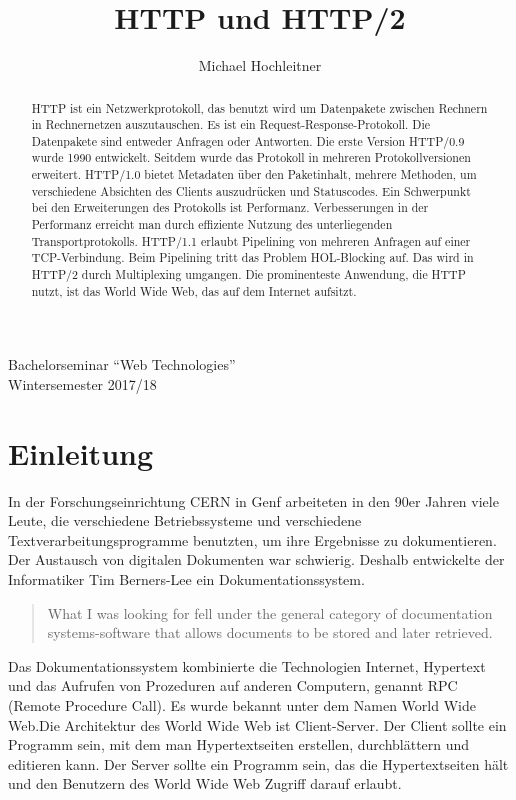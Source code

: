 \documentclass{llncs}
\begin{document}
\title{HTTP und HTTP/2}
\author{Michael Hochleitner}

\maketitle 
\begin{center}
Bachelorseminar ``Web Technologies'' \\
Wintersemester 2017/18
\end{center}

\begin{abstract}
HTTP ist ein Netzwerkprotokoll, das benutzt wird um Datenpakete zwischen Rechnern in Rechnernetzen auszutauschen. Es ist ein Request-Response-Protokoll. Die Datenpakete sind entweder Anfragen oder Antworten. Die erste Version HTTP/0.9 wurde 1990 entwickelt. Seitdem wurde das Protokoll in mehreren Protokollversionen erweitert. HTTP/1.0 bietet Metadaten über den Paketinhalt, mehrere Methoden, um verschiedene Absichten des Clients auszudrücken  und Statuscodes.
Ein Schwerpunkt bei den Erweiterungen des Protokolls ist Performanz. Verbesserungen in der Performanz erreicht man durch effiziente Nutzung des unterliegenden Transportprotokolls. HTTP/1.1 erlaubt Pipelining von mehreren Anfragen auf einer TCP-Verbindung. Beim Pipelining tritt das Problem HOL-Blocking auf. Das wird in HTTP/2 durch Multiplexing umgangen.  Die prominenteste Anwendung, die HTTP nutzt, ist das World Wide Web, das auf dem Internet aufsitzt.
\end{abstract}

\section{Einleitung}
In der Forschungseinrichtung CERN in Genf arbeiteten in den 90er Jahren viele Leute, die verschiedene Betriebssysteme und verschiedene Textverarbeitungsprogramme benutzten, um ihre Ergebnisse zu dokumentieren. Der Austausch von digitalen Dokumenten war schwierig. Deshalb entwickelte der Informatiker Tim Berners-Lee ein Dokumentationssystem. \begin{quote}What I was looking for fell under the general category of documentation systems-software that allows documents to be stored and later retrieved. \cite{Berners-Lee1999} \end{quote}
Das Dokumentationssystem kombinierte die Technologien Internet, Hypertext und das Aufrufen von Prozeduren auf anderen Computern, genannt RPC (Remote Procedure Call). Es wurde bekannt unter dem Namen World Wide Web.\newline Die Architektur des World Wide Web ist Client-Server. Der Client sollte ein Programm sein, mit dem man Hypertextseiten erstellen, durchblättern und editieren kann.\cite{Berners-Lee1999} Der Server sollte ein Programm sein, das die Hypertextseiten hält und den Benutzern des World Wide Web Zugriff darauf erlaubt.\cite{Berners-Lee1999}
\end{document}
